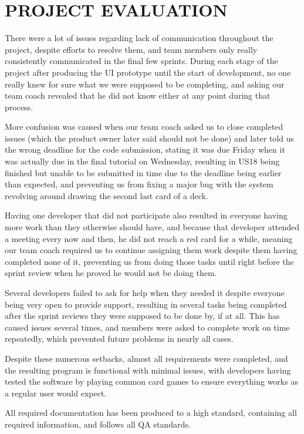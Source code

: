 \documentclass[a4paper]{project}
\begin{document}
	\section{PROJECT EVALUATION}\label{sec:project-evaluation}
	
		There were a lot of issues regarding lack of communication throughout the project, despite efforts to resolve them, and team members only really consistently communicated in the final few sprints. During each stage of the project after producing the UI prototype until the start of development, no one really knew for sure what we were supposed to be completing, and asking our team coach revealed that he did not know either at any point during that process.
		
		More confusion was caused when our team coach asked us to close completed issues (which the product owner later said should not be done) and later told us the wrong deadline for the code submission, stating it was due Friday when it was actually due in the final tutorial on Wednesday, resulting in US18 being finished but unable to be submitted in time due to the deadline being earlier than expected, and preventing us from fixing a major bug with the system revolving around drawing the second last card of a deck.
		
		Having one developer that did not participate also resulted in everyone having more work than they otherwise should have, and because that developer attended a meeting every now and then, he did not reach a red card for a while, meaning our team coach required us to continue assigning them work despite them having completed none of it, preventing us from doing those tasks until right before the sprint review when he proved he would not be doing them.
		
		Several developers failed to ask for help when they needed it despite everyone being very open to provide support, resulting in several tasks being completed after the sprint reviews they were supposed to be done by, if at all. This has caused issues several times, and members were asked to complete work on time repeatedly, which prevented future problems in nearly all cases.
		
		Despite these numerous setbacks, almost all requirements were completed, and the resulting program is functional with minimal issues, with developers having tested the software by playing common card games to ensure everything works as a regular user would expect.
		
		All required documentation has been produced to a high standard, containing all required information, and follows all QA standards.
		
\end{document}
